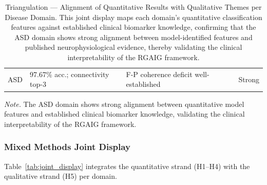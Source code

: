 \begin{table}[H]
\centering
\caption[Triangulation of Quantitative and Qualitative Findings]{Triangulation --- Alignment of Quantitative Results with Qualitative Themes per Disease Domain. This joint display maps each domain's quantitative classification features against established clinical biomarker knowledge, confirming that the ASD domain shows strong alignment between model-identified features and published neurophysiological evidence, thereby validating the clinical interpretability of the RGAIG framework.}
\tablestripes\tablefontsize
\begin{tabularx}{\textwidth}{@{} >{\raggedright\arraybackslash}p{0.8cm} L L >{\raggedright\arraybackslash}p{1.2cm} @{}}
\toprule
{} &  &  &  \\
\midrule
ASD & 97.67\% acc.; connectivity top-3 & F-P coherence deficit well-established & Strong \\
\bottomrule
\end{tabularx}

\vspace{0.5em}\noindent\textit{Note.} The ASD domain shows strong alignment between quantitative model features and established clinical biomarker knowledge, validating the clinical interpretability of the RGAIG framework.
\end{table}

\subsubsection{Mixed Methods Joint Display}

Table~\ref{tab:joint_display} integrates the quantitative strand (H1--H4) with the qualitative strand (H5) per domain.


